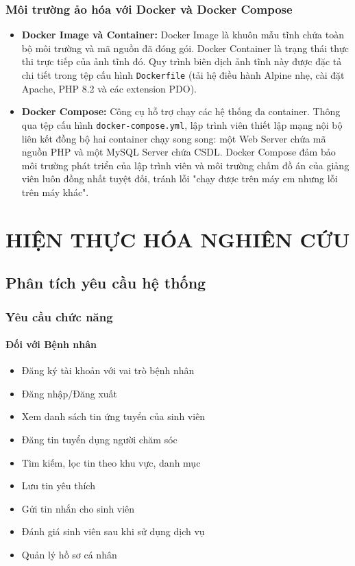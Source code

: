 \documentclass[a4paper,12pt]{report}
\begin{document}
\subsection{Môi trường ảo hóa với Docker và Docker Compose}
\begin{itemize}
    \item \textbf{Docker Image và Container:} Docker Image là khuôn mẫu tĩnh chứa toàn bộ môi trường và mã nguồn đã đóng gói. Docker Container là trạng thái thực thi trực tiếp của ảnh tĩnh đó. Quy trình biên dịch ảnh tĩnh này được đặc tả chi tiết trong tệp cấu hình \texttt{Dockerfile} (tải hệ điều hành Alpine nhẹ, cài đặt Apache, PHP 8.2 và các extension PDO).
    \item \textbf{Docker Compose:} Công cụ hỗ trợ chạy các hệ thống đa container. Thông qua tệp cấu hình \texttt{docker-compose.yml}, lập trình viên thiết lập mạng nội bộ liên kết đồng bộ hai container chạy song song: một Web Server chứa mã nguồn PHP và một MySQL Server chứa CSDL. Docker Compose đảm bảo môi trường phát triển của lập trình viên và môi trường chấm đồ án của giảng viên luôn đồng nhất tuyệt đối, tránh lỗi "chạy được trên máy em nhưng lỗi trên máy khác".
\end{itemize}


\chapter{HIỆN THỰC HÓA NGHIÊN CỨU}

\section{Phân tích yêu cầu hệ thống}

\subsection{Yêu cầu chức năng}

\subsubsection{Đối với Bệnh nhân}
\begin{itemize}
    \item Đăng ký tài khoản với vai trò bệnh nhân
    \item Đăng nhập/Đăng xuất
    \item Xem danh sách tin ứng tuyển của sinh viên
    \item Đăng tin tuyển dụng người chăm sóc
    \item Tìm kiếm, lọc tin theo khu vực, danh mục
    \item Lưu tin yêu thích
    \item Gửi tin nhắn cho sinh viên
    \item Đánh giá sinh viên sau khi sử dụng dịch vụ
    \item Quản lý hồ sơ cá nhân
\end{itemize}
\end{document}
